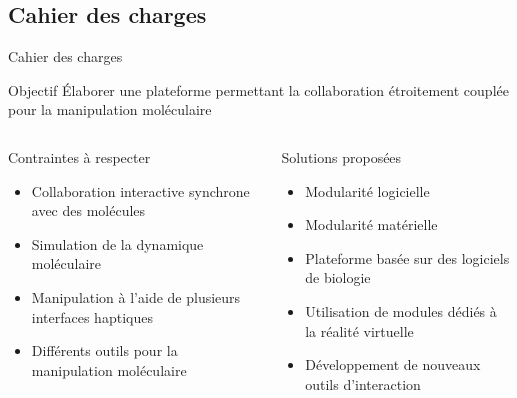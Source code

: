 \documentclass[english,french,dvips,10pt]{mybeamer}
\begin{document}
	\subsection{Cahier des charges}
	\begin{myframe}{Cahier des charges}
		\begin{myblock}{Objectif}
			Élaborer une plateforme permettant la collaboration étroitement couplée pour la manipulation moléculaire
		\end{myblock}
		\begin{columns}[T]
			\begin{column}{0.475\textwidth}
				\begin{myminusblock}{Contraintes à respecter}
					\begin{itemize}
						\item Collaboration interactive synchrone avec des molécules
						\item Simulation de la dynamique moléculaire
						\item Manipulation à l'aide de plusieurs interfaces haptiques
						\item Différents outils pour la manipulation moléculaire
					\end{itemize}
				\end{myminusblock}
			\end{column}
			\begin{column}{0.475\textwidth}
				\begin{myplusblock}{Solutions proposées}
					\begin{itemize}
						\item Modularité logicielle
						\item Modularité matérielle
						\item Plateforme basée sur des logiciels de biologie
						\item Utilisation de modules dédiés à la réalité virtuelle
						\item Développement de nouveaux outils d'interaction
					\end{itemize}
				\end{myplusblock}
			\end{column}
		\end{columns}
	\end{myframe}
\end{document}
